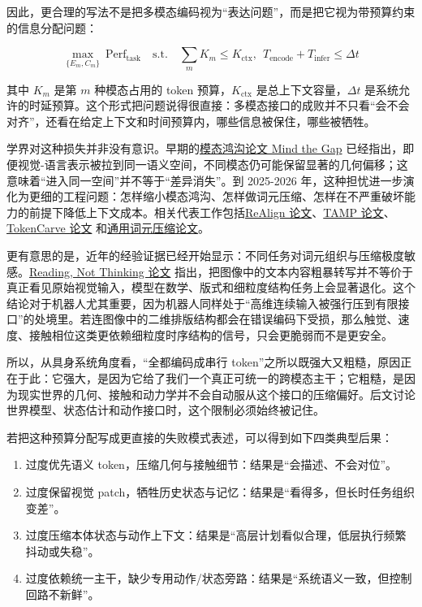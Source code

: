 因此，更合理的写法不是把多模态编码视为“表达问题”，而是把它视为带预算约束的信息分配问题：

\begingroup
\scriptsize
\begin{equation*}
\max_{\{E_m, C_m\}} \ \mathrm{Perf}_{\text{task}}
\quad
\text{s.t.}\quad
\sum_m K_m \le K_{\text{ctx}}, \ \ 
T_{\text{encode}} + T_{\text{infer}} \le \Delta t
\end{equation*}
\endgroup

其中 \(K_m\) 是第 \(m\) 种模态占用的 token 预算，\(K_{\text{ctx}}\) 是总上下文容量，\(\Delta t\) 是系统允许的时延预算。这个形式把问题说得很直接：多模态接口的成败并不只看“会不会对齐”，还看在给定上下文和时间预算内，哪些信息被保住，哪些被牺牲。

学界对这种损失并非没有意识。早期的\href{https://arxiv.org/abs/2203.02053}{模态鸿沟论文 Mind the Gap} 已经指出，即便视觉-语言表示被拉到同一语义空间，不同模态仍可能保留显著的几何偏移；这意味着“进入同一空间”并不等于“差异消失”。到 2025-2026 年，这种担忧进一步演化为更细的工程问题：怎样缩小模态鸿沟、怎样做词元压缩、怎样在不严重破坏能力的前提下降低上下文成本。相关代表工作包括\href{https://arxiv.org/abs/2602.07026}{ReAlign 论文}、\href{https://arxiv.org/abs/2504.09897}{TAMP 论文}、\href{https://arxiv.org/abs/2503.10501}{TokenCarve 论文} 和\href{https://arxiv.org/abs/2506.01097}{通用词元压缩论文}。

更有意思的是，近年的经验证据已经开始显示：不同任务对词元组织与压缩极度敏感。\href{https://arxiv.org/abs/2603.09095}{Reading, Not Thinking 论文} 指出，把图像中的文本内容粗暴转写并不等价于真正看见原始视觉输入，模型在数学、版式和细粒度结构任务上会显著退化。这个结论对于机器人尤其重要，因为机器人同样处于“高维连续输入被强行压到有限接口”的处境里。若连图像中的二维排版结构都会在错误编码下受损，那么触觉、速度、接触相位这类更依赖细粒度时序结构的信号，只会更脆弱而不是更安全。

所以，从具身系统角度看，“全都编码成串行 token”之所以既强大又粗糙，原因正在于此：它强大，是因为它给了我们一个真正可统一的跨模态主干；它粗糙，是因为现实世界的几何、接触和动力学并不会自动服从这个接口的压缩偏好。后文讨论世界模型、状态估计和动作接口时，这个限制必须始终被记住。

若把这种预算分配写成更直接的失败模式表述，可以得到如下四类典型后果：

\begin{enumerate}
\item 过度优先语义 token，压缩几何与接触细节：结果是“会描述、不会对位”。
\item 过度保留视觉 patch，牺牲历史状态与记忆：结果是“看得多，但长时任务组织变差”。
\item 过度压缩本体状态与动作上下文：结果是“高层计划看似合理，低层执行频繁抖动或失稳”。
\item 过度依赖统一主干，缺少专用动作/状态旁路：结果是“系统语义一致，但控制回路不新鲜”。
\end{enumerate}

